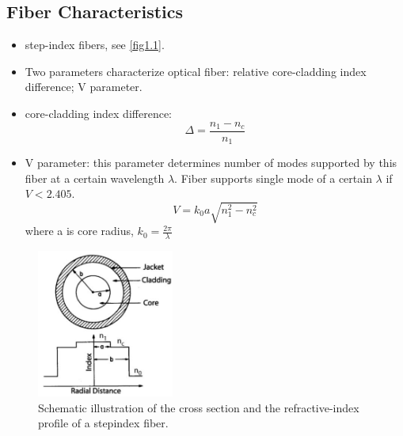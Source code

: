 \documentclass[12pt]{extarticle}
\numberwithin{equation}{section}
\numberwithin{figure}{section}
\numberwithin{table}{section}
\newcommand{\<}{\langle}
\renewcommand{\>}{\rangle}
\theoremstyle{definition}
\begin{document}
    \subsection{Fiber Characteristics}
        \begin{itemize}
            \item step-index fibers, see \autoref{fig1.1}.
            \item Two parameters characterize optical fiber: relative core-cladding index difference; V parameter.
            \item core-cladding index difference:
                \begin{equation}
                    \Delta = \frac{n_1 - n_c}{n_1}
                    \label{core-cladding index difference}
                \end{equation}
            \item V parameter: this parameter determines number of modes supported by this fiber at a certain wavelength $\lambda$. Fiber supports single mode of a certain $\lambda$ if $V < 2.405$.
                \begin{equation}
                    V = k_0 a \sqrt{n_1^2 - n_c^2}
                    \label{V parameter}
                \end{equation}
            where a is core radius, $k_0 = \frac{2\pi}{\lambda}$
        \end{itemize}
    
        \begin{figure}[htbp]
            \centering
            \includegraphics[width=0.4\textwidth]{images/fig1.1.PNG}
            \caption{Schematic illustration of the cross section and the refractive-index proﬁle of a stepindex ﬁber.}
            \label{fig1.1}
        \end{figure}
        
\end{document}
